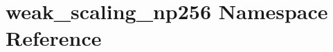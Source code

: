 \hypertarget{namespaceweak__scaling__np256}{}\section{weak\+\_\+scaling\+\_\+np256 Namespace Reference}
\label{namespaceweak__scaling__np256}

